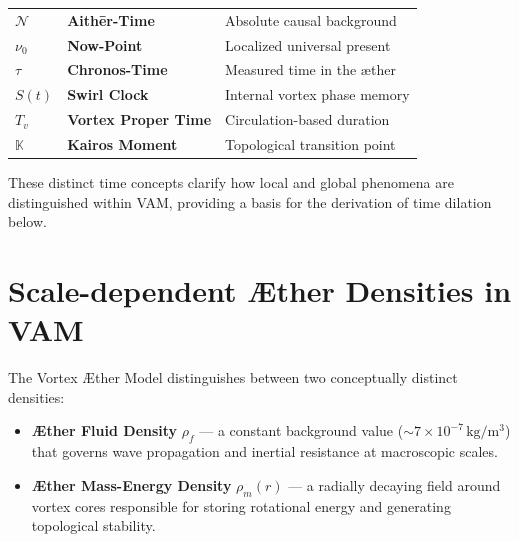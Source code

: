 \documentclass[preprint]{revtex4-2}
\begin{document}
\begin{center}
\begin{tcolorbox}[
  colback=gray!10,
  colframe=black,
  width=0.9\textwidth,
  sharp corners=southwest,
  boxrule=0.5pt,
  before skip=10pt,
  after skip=10pt,
  title=\textbf{Table: Ætheric Time Modes in the Vortex Æther Model},
  fonttitle=\bfseries,
]
\renewcommand{\arraystretch}{1.25}
\begin{tabular}{@{}lll@{}}
  \(\mathcal{N}\)     & \textbf{Aithēr-Time}         & Absolute causal background \\
  \(\nu_0\)           & \textbf{Now-Point}           & Localized universal present \\
  \(\tau\)            & \textbf{Chronos-Time}        & Measured time in the æther \\
  \(S(t)\)            & \textbf{Swirl Clock}         & Internal vortex phase memory \\
  \(T_v\)             & \textbf{Vortex Proper Time}  & Circulation-based duration \\
  \(\mathbb{K}\)      & \textbf{Kairos Moment}       & Topological transition point \\
\end{tabular}
\end{tcolorbox}
\end{center}

\label{tab:ÆtherTimeModes}



These distinct time concepts clarify how local and global phenomena are distinguished within VAM, providing a basis for the derivation of time dilation below.



\section*{Scale-dependent Æther Densities in VAM}


The Vortex Æther Model distinguishes between two conceptually distinct densities:

\begin{itemize}
    \item \textbf{Æther Fluid Density} \(\rho_{\scriptscriptstyle\boldsymbol\!f}\) — a constant background value (\(\sim 7 \times 10^{-7}\, \mathrm{kg/m^3}\)) that governs wave propagation and inertial resistance at macroscopic scales.
    \item \textbf{Æther Mass-Energy Density} \(\rho_{\scriptscriptstyle\boldsymbol\!m}(r)\) — a radially decaying field around vortex cores responsible for storing rotational energy and generating topological stability.
\end{itemize}
\end{document}
